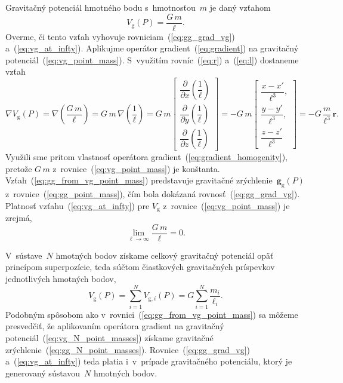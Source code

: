 \documentclass[a4paper, 12pt]{book}
\newcommand{\gidx}{\mathrm g}
\let\vec\mathbf
\begin{document}
Gravitačný potenciál hmotného bodu s~hmotnosťou~$m$ je daný vzťahom
%
\begin{equation}
\label{eq:vg_point_mass}
V_\gidx(P) = \frac{G \, m}{\ell}{.}
\end{equation}
%
Overme, či tento vzťah vyhovuje rovniciam~(\ref{eq:gg_grad_vg}) 
a~(\ref{eq:vg_at_infty}).  Aplikujme operátor gradient~(\ref{eq:gradient}) na 
gravitačný potenciál~(\ref{eq:vg_point_mass}).  S~využitím rovníc~(\ref{eq:r}) 
a~(\ref{eq:l}) dostaneme vzťah
%
\begin{equation}
\label{eq:gg_from_vg_point_mass}
\nabla V_\gidx(P) = \nabla \left( \frac{G \, m}{\ell} \right) = G \, m \, 
\nabla \left( \frac{1}{\ell} \right) =
%
G \, m
%
\begin{bmatrix}
\dfrac{\partial}{\partial x} \left( \dfrac{1}{\ell} \right)\\[2ex]
\dfrac{\partial}{\partial y} \left( \dfrac{1}{\ell} \right)\\[2ex]
\dfrac{\partial}{\partial z} \left( \dfrac{1}{\ell} \right)
\end{bmatrix}
%
=
%
-G \, m
%
\begin{bmatrix}
\dfrac{x - x'}{\ell^3}{,}\\[2ex]
\dfrac{y - y'}{\ell^3}{,}\\[2ex]
\dfrac{z - z'}{\ell^3}
\end{bmatrix}
%
=
%
-G \, \frac{m}{\ell^3} \, \vec{r}{.}
\end{equation}
%
Využili sme pritom vlastnosť operátora gradient~(\ref{eq:gradient_homogenity}), 
pretože $G \, m$ z~rovnice~(\ref{eq:vg_point_mass}) je konštanta.  
Vzťah~(\ref{eq:gg_from_vg_point_mass}) predstavuje gravitačné zrýchlenie~$\vec 
g_\gidx(P)$ z~rovnice~(\ref{eq:gg_point_mass}), čím bola dokázaná 
rovnosť~(\ref{eq:gg_grad_vg}).  Platnosť vzťahu~(\ref{eq:vg_at_infty}) pre 
$V_\gidx$ z~rovnice~(\ref{eq:vg_point_mass}) je zrejmá,
%
\begin{equation}
\lim_{\ell \to \infty} \frac{G \, m}{\ell} = 0{.}
\end{equation}

V~sústave~$N$ hmotných bodov získame celkový gravitačný potenciál opäť 
princípom superpozície, teda súčtom čiastkových gravitačných príspevkov 
jednotlivých hmotných bodov,
%
\begin{equation}
\label{eq:vg_N_point_masses}
V_\gidx(P) = \sum_{i = 1}^{N} V_{\gidx,i}(P) = G \sum_{i = 1}^{N}\frac{
m_i}{\ell_i}{.}
\end{equation}
%
Podobným spôsobom ako v~rovnici~(\ref{eq:gg_from_vg_point_mass}) sa môžeme 
presvedčiť, že aplikovaním operátora gradient na gravitačný 
potenciál~(\ref{eq:vg_N_point_masses}) získame gravitačné 
zrýchlenie~(\ref{eq:gg_N_point_masses}).  Rovnice~(\ref{eq:gg_grad_vg}) 
a~(\ref{eq:vg_at_infty}) teda platia i~v~prípade gravitačného potenciálu, ktorý 
je generovaný sústavou~$N$ hmotných bodov.
\end{document}
